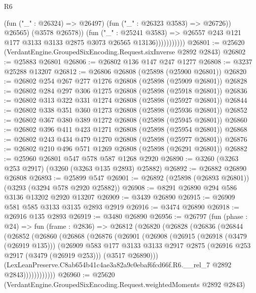 \begin{lexlean}{R6}
\begin{coremodule}
                              (fun ("_" : @26324) => @26497)
                              (fun ("_" : @26323 @3583) => @26726))
                            @26565)
                          (@3578 @26578))
                        (fun ("_" : @25241 @3583) =>
                        @26557 @243 @121 @177 @3133 @3133 @2875 @3073 @26565 @13136)))))))))))
@26801 := @25620 (VerdantEngine.GroupedSixEncoding.Request.sixInverse @2892 @2843)
@26802 := @25883 @26801
@26806 := @26802 @136 @147 @247 @1277
@26808 := @3237 @25288 @13207
@26812 := @26806 @26808 (@25898 (@25900 @26801))
@26820 := @26802 @254 @267 @277 @1276 @26808 (@25898 (@25909 @26801))
@26828 := @26802 @284 @297 @306 @1275 @26808 (@25898 (@25918 @26801))
@26836 := @26802 @313 @322 @331 @1274 @26808 (@25898 (@25927 @26801))
@26844 := @26802 @338 @351 @360 @1273 @26808 (@25898 (@25936 @26801))
@26852 := @26802 @367 @380 @389 @1272 @26808 (@25898 (@25945 @26801))
@26860 := @26802 @396 @411 @423 @1271 @26808 (@25898 (@25954 @26801))
@26868 := @26802 @243 @434 @479 @1270 @26808 (@25898 (@25977 @26801))
@26876 := @26802 @210 @496 @571 @1269 @26808 (@25898 (@26291 @26801))
@26882 := @25960 @26801 @547 @578 @587 @1268 @2920
@26890 := @3260 (@3263 @253 @2917) (@3260 (@3263 @135 @2893) @25882)
@26892 := @26882 @26890 @26808
@26893 := @25899 @547
@26901 := @26892 (@25898 (@26893 @26801)) (@3293 (@3294 @578 @2920 @25882))
@26908 := @8291 @26890 @294 @586 @3136 @13202 @2920 @13207
@26909 := @3439 @26890
@26915 := @26909 @581 @585 @3133 @3135 @2893 @2919
@26916 := @3474 @26890
@26918 := @26916 @135 @2893
@26919 := @3480 @26890
@26956 := @26797
    (fun (phase : @24) =>
    fun (frame : @2836) =>
    @26812
      (@26820
        (@26828
          (@26836
            (@26844
              (@26852
                (@26860
                  (@26868
                    (@26876
                      (@26901
                        (@26908
                          (@26915
                            (@26918 (@3479 (@26919 @135)))
                            (@26909
                              @583
                              @177
                              @3133
                              @3133
                              @2917
                              @2875
                              (@26916 @253 @2917 (@3479 (@26919 @253)))
                              (@3517 @26890)))
                          (LexLeanPreserve.C8ab654b41c4ae3a82a9c0ebaf6fcd66f.R6.__rel_7
                            @2892
                            @2843))))))))))))
@26960 := @25620 (VerdantEngine.GroupedSixEncoding.Request.weightedMoments @2892 @2843)

\end{coremodule}
\end{lexlean}
